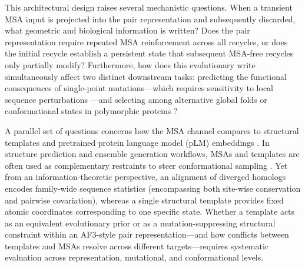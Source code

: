 \documentclass[10pt,a4paper]{article}
\begin{document}
This architectural design raises several mechanistic questions. When a transient MSA input is projected into the pair representation and subsequently discarded, what geometric and biological information is written? Does the pair representation require repeated MSA reinforcement across all recycles, or does the initial recycle establish a persistent state that subsequent MSA-free recycles only partially modify? Furthermore, how does this evolutionary write simultaneously affect two distinct downstream tasks: predicting the functional consequences of single-point mutations---which requires sensitivity to local sequence perturbations \citep{starr2020deep,notin2022tranception,notin2023proteingym}---and selecting among alternative global folds or conformational states in polymorphic proteins \citep{porter2018extant,chakravarty2022alphafold2,wayment2024predicting,chakravarty2024alphafold}?

A parallel set of questions concerns how the MSA channel compares to structural templates and pretrained protein language model (pLM) embeddings \citep{lin2023evolutionary,hayes2025simulating}. In structure prediction and ensemble generation workflows, MSAs and templates are often used as complementary restraints to steer conformational sampling \citep{del2022sampling,stein2022speach,sala2023biasing,heo2022multi,kalakoti2025afsample2}. Yet from an information-theoretic perspective, an alignment of diverged homologs encodes family-wide sequence statistics (encompassing both site-wise conservation and pairwise covariation), whereas a single structural template provides fixed atomic coordinates corresponding to one specific state. Whether a template acts as an equivalent evolutionary prior or as a mutation-suppressing structural constraint within an AF3-style pair representation---and how conflicts between templates and MSAs resolve across different targets---requires systematic evaluation across representation, mutational, and conformational levels.
\end{document}
